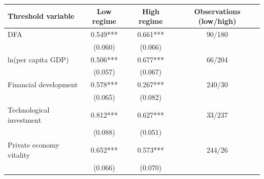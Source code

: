 \begin{tabular}{lccc}
\toprule
Threshold variable & Low regime & High regime & Observations (low/high) \\
\midrule
DFA & 0.549*** & 0.661*** & 90/180 \\
 & (0.060) & (0.066) & \\[2pt]
ln(per capita GDP) & 0.506*** & 0.677*** & 66/204 \\
 & (0.057) & (0.067) & \\[2pt]
Financial development & 0.578*** & 0.267*** & 240/30 \\
 & (0.065) & (0.082) & \\[2pt]
Technological investment & 0.812*** & 0.627*** & 33/237 \\
 & (0.088) & (0.051) & \\[2pt]
Private economy vitality & 0.652*** & 0.573*** & 244/26 \\
 & (0.066) & (0.070) & \\[2pt]
\bottomrule
\end{tabular}